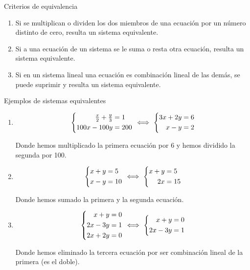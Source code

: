 \documentclass[11pt,a4paper]{article}
\newcommand{\fmdisp}[1]{\[\setbox2=\hbox{$\displaystyle #1$}\ifdim\wd2>\linewidth\resizebox{\linewidth}{!}{\box2}\else\box2\fi\]}
\begin{document}
\begin{fmprop}{Criterios de equivalencia}
\begin{enumerate}
\item Si se multiplican o dividen los dos miembros de una ecuación por un número distinto de cero, resulta un sistema equivalente.
\item Si a una ecuación de un sistema se le suma o resta otra ecuación, resulta un sistema equivalente.
\item Si en un sistema lineal una ecuación es combinación lineal de las demás, se puede suprimir y resulta un sistema equivalente.
\end{enumerate}
\end{fmprop}

\begin{fmex}{Ejemplos de sistemas equivalentes}
\begin{enumerate}[label=\textbf{\arabic*.},leftmargin=*]
\item
\fmdisp{\left\{\begin{aligned}\tfrac{x}{2}+\tfrac{y}{3}&=1\\ 100x-100y&=200\end{aligned}\right.\ \Longleftrightarrow\ \left\{\begin{aligned}3x+2y&=6\\ x-y&=2\end{aligned}\right.}

          Donde hemos multiplicado la primera ecuación por 6 y hemos dividido la segunda por 100.
\item
\fmdisp{\left\{\begin{aligned}x+y&=5\\ x-y&=10\end{aligned}\right.\ \Longleftrightarrow\ \left\{\begin{aligned}x+y&=5\\ 2x&=15\end{aligned}\right.}

          Donde hemos sumado la primera y la segunda ecuación.
\item
\fmdisp{\left\{\begin{aligned}x+y&=0\\ 2x-3y&=1\\ 2x+2y&=0\end{aligned}\right.\ \Longleftrightarrow\ \left\{\begin{aligned}x+y&=0\\ 2x-3y&=1\end{aligned}\right.}

          Donde hemos eliminado la tercera ecuación por ser combinación lineal de la primera (es el doble).
\end{enumerate}
\end{fmex}
\end{document}
